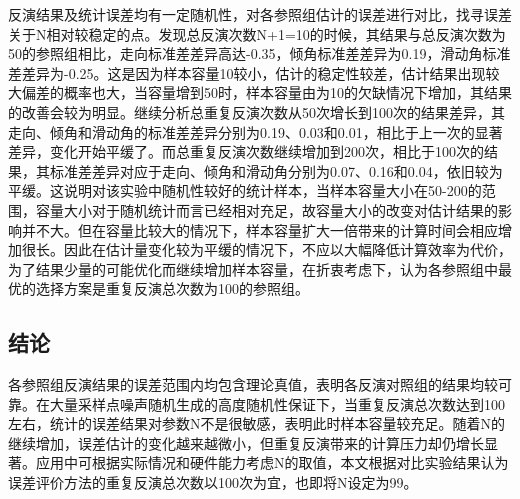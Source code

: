 反演结果及统计误差均有一定随机性，对各参照组估计的误差进行对比，找寻误差关于N相对较稳定的点。发现总反演次数N+1=10的时候，其结果与总反演次数为50的参照组相比，走向标准差差异高达-0.35，倾角标准差差异为0.19，滑动角标准差差异为-0.25。这是因为样本容量10较小，估计的稳定性较差，估计结果出现较大偏差的概率也大，当容量增到50时，样本容量由为10的欠缺情况下增加，其结果的改善会较为明显。继续分析总重复反演次数从50次增长到100次的结果差异，其走向、倾角和滑动角的标准差差异分别为0.19、0.03和0.01，相比于上一次的显著差异，变化开始平缓了。而总重复反演次数继续增加到200次，相比于100次的结果，其标准差差异对应于走向、倾角和滑动角分别为0.07、0.16和0.04，依旧较为平缓。这说明对该实验中随机性较好的统计样本，当样本容量大小在50-200的范围，容量大小对于随机统计而言已经相对充足，故容量大小的改变对估计结果的影响并不大。但在容量比较大的情况下，样本容量扩大一倍带来的计算时间会相应增加很长。因此在估计量变化较为平缓的情况下，不应以大幅降低计算效率为代价，为了结果少量的可能优化而继续增加样本容量，在折衷考虑下，认为各参照组中最优的选择方案是重复反演总次数为100的参照组。

\subsection{结论}
各参照组反演结果的误差范围内均包含理论真值，表明各反演对照组的结果均较可靠。在大量采样点噪声随机生成的高度随机性保证下，当重复反演总次数达到100左右，统计的误差结果对参数N不是很敏感，表明此时样本容量较充足。随着N的继续增加，误差估计的变化越来越微小，但重复反演带来的计算压力却仍增长显著。应用中可根据实际情况和硬件能力考虑N的取值，本文根据对比实验结果认为误差评价方法的重复反演总次数以100次为宜，也即将N设定为99。
